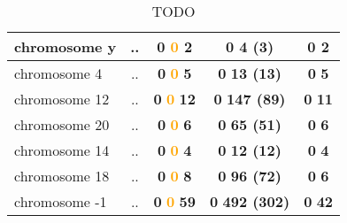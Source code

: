 \begin{table}[H]
\begin{tabular}{||l|c|c|c|c||}
\hline
chromosome y&..&\textcolor{vert}{\textbf{0}} \textcolor{orange}{\textbf{0}} \textcolor{rose}{\textbf{2}} &\textcolor{vert}{\textbf{0}} \textcolor{rose}{\textbf{4 (3)}} &\textcolor{vert}{\textbf{0}} \textcolor{rose}{\textbf{2}} \\
\hline
chromosome 4&..&\textcolor{vert}{\textbf{0}} \textcolor{orange}{\textbf{0}} \textcolor{rose}{\textbf{5}} &\textcolor{vert}{\textbf{0}} \textcolor{rose}{\textbf{13 (13)}} &\textcolor{vert}{\textbf{0}} \textcolor{rose}{\textbf{5}} \\
\hline
chromosome 12&..&\textcolor{vert}{\textbf{0}} \textcolor{orange}{\textbf{0}} \textcolor{rose}{\textbf{12}} &\textcolor{vert}{\textbf{0}} \textcolor{rose}{\textbf{147 (89)}} &\textcolor{vert}{\textbf{0}} \textcolor{rose}{\textbf{11}} \\
\hline
chromosome 20&..&\textcolor{vert}{\textbf{0}} \textcolor{orange}{\textbf{0}} \textcolor{rose}{\textbf{6}} &\textcolor{vert}{\textbf{0}} \textcolor{rose}{\textbf{65 (51)}} &\textcolor{vert}{\textbf{0}} \textcolor{rose}{\textbf{6}} \\
\hline
chromosome 14&..&\textcolor{vert}{\textbf{0}} \textcolor{orange}{\textbf{0}} \textcolor{rose}{\textbf{4}} &\textcolor{vert}{\textbf{0}} \textcolor{rose}{\textbf{12 (12)}} &\textcolor{vert}{\textbf{0}} \textcolor{rose}{\textbf{4}} \\
\hline
chromosome 18&..&\textcolor{vert}{\textbf{0}} \textcolor{orange}{\textbf{0}} \textcolor{rose}{\textbf{8}} &\textcolor{vert}{\textbf{0}} \textcolor{rose}{\textbf{96 (72)}} &\textcolor{vert}{\textbf{0}} \textcolor{rose}{\textbf{6}} \\
\hline
chromosome -1&..&\textcolor{vert}{\textbf{0}} \textcolor{orange}{\textbf{0}} \textcolor{rose}{\textbf{59}} &\textcolor{vert}{\textbf{0}} \textcolor{rose}{\textbf{492 (302)}} &\textcolor{vert}{\textbf{0}} \textcolor{rose}{\textbf{42}} \\
\hline
\hline
		\end{tabular}
	\caption{TODO}
	\label{tab:TODO}
\end{table}